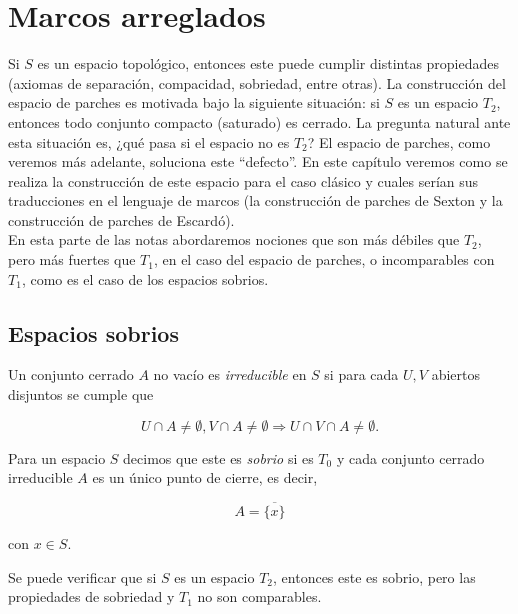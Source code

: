\chapter{Marcos arreglados}\label{Parches}

Si $S$ es un espacio topológico, entonces este puede cumplir distintas propiedades (axiomas de separación, compacidad, sobriedad, entre otras). La construcción del espacio de parches es motivada bajo la siguiente situación: si $S$ es un espacio $T_2$, entonces todo conjunto compacto (saturado) es cerrado. La pregunta natural ante esta situación es, ¿qué pasa si el espacio no es $T_2$? El espacio de parches, como veremos más adelante, soluciona este ``defecto''. En este capítulo veremos como se realiza la construcción de este espacio para el caso clásico y cuales serían sus traducciones en el lenguaje de marcos (la construcción de parches de Sexton y la construcción de parches de Escardó).\\

En esta parte de las notas abordaremos nociones que son más débiles que $T_2$, pero más fuertes que $T_1$, en el caso del espacio de parches, o incomparables con $T_1$, como es el caso de los espacios sobrios.

\section{Espacios sobrios}\label{Espacios sobrios}

\begin{dfn}\label{irreducible}
    Un conjunto cerrado $A$ no vacío es \emph{irreducible} en $S$ si para cada $U, V$ abiertos disjuntos se cumple que 

    \[
    U\cap A\neq \emptyset, V\cap A\neq \emptyset \Rightarrow U\cap V\cap A\neq \emptyset.
    \]
\end{dfn}

\begin{dfn}\label{sobrio}
    Para un espacio $S$ decimos que este es \emph{sobrio} si es $T_0$ y cada conjunto cerrado irreducible $A$ es un único punto de cierre, es decir,

    \[
    A=\overline{\{x\}}
    \]

    con $x\in S$.
\end{dfn}

Se puede verificar que si $S$ es un espacio $T_2$, entonces este es sobrio, pero las propiedades de sobriedad y $T_1$ no son comparables.\\

